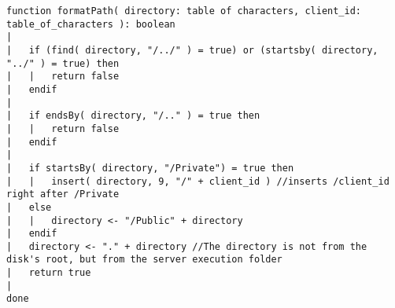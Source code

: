 \begin{lstlisting}
function formatPath( directory: table of characters, client_id: table_of_characters ): boolean
|
|	if (find( directory, "/../" ) = true) or (startsby( directory, "../" ) = true) then
|	|	return false
|	endif
|
|	if endsBy( directory, "/.." ) = true then
|	|	return false
|	endif
|
|	if startsBy( directory, "/Private") = true then
|	|	insert( directory, 9, "/" + client_id ) //inserts /client_id right after /Private
|	else
|	|	directory <- "/Public" + directory
|	endif
|	directory <- "." + directory //The directory is not from the disk's root, but from the server execution folder
|	return true
|
done
\end{lstlisting}
